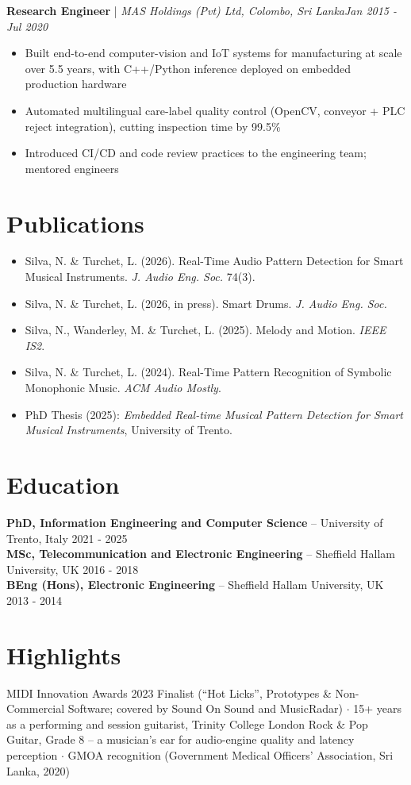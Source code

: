 \documentclass[11pt]{article}
\newenvironment{cvrole}[5]{%
  \par\noindent\textbf{\large #1} | \textit{\small #2, #3}\hfill \textit{\small #4 - #5}\par
  \begin{itemize}[leftmargin=2em, itemsep=-0.3em, topsep=-0.5em]%
}{%
  \end{itemize}\par\noindent\mbox{}\par\vspace{0.1em}%
}
\begin{document}
\begin{cvrole}{Research Engineer}{MAS Holdings (Pvt) Ltd}{Colombo, Sri Lanka}{Jan 2015}{Jul 2020}
    \item Built end-to-end computer-vision and IoT systems for manufacturing at scale over 5.5 years, with C++/Python inference deployed on embedded production hardware
    \item Automated multilingual care-label quality control (OpenCV, conveyor + PLC reject integration), cutting inspection time by 99.5\%
    \item Introduced CI/CD and code review practices to the engineering team; mentored engineers
\end{cvrole}

\enlargethispage{9\baselineskip}
\section*{Publications}
\begin{itemize}[leftmargin=2em, itemsep=-0.2em, topsep=0.2em]
    \item Silva, N. \& Turchet, L. (2026). Real-Time Audio Pattern Detection for Smart Musical Instruments. \textit{J. Audio Eng. Soc.} 74(3).
    \item Silva, N. \& Turchet, L. (2026, in press). Smart Drums. \textit{J. Audio Eng. Soc.}
    \item Silva, N., Wanderley, M. \& Turchet, L. (2025). Melody and Motion. \textit{IEEE IS2}.
    \item Silva, N. \& Turchet, L. (2024). Real-Time Pattern Recognition of Symbolic Monophonic Music. \textit{ACM Audio Mostly}.
    \item PhD Thesis (2025): \textit{Embedded Real-time Musical Pattern Detection for Smart Musical Instruments}, University of Trento.
\end{itemize}

\section*{Education}
\textbf{PhD, Information Engineering and Computer Science} -- University of Trento, Italy \hfill 2021 - 2025 \\
\textbf{MSc, Telecommunication and Electronic Engineering} -- Sheffield Hallam University, UK \hfill 2016 - 2018 \\
\textbf{BEng (Hons), Electronic Engineering} -- Sheffield Hallam University, UK \hfill 2013 - 2014

\enlargethispage{4\baselineskip}
\section*{Highlights}
MIDI Innovation Awards 2023 Finalist (``Hot Licks'', Prototypes \& Non-Commercial Software; covered by Sound On Sound and MusicRadar) $\cdot$ 15+ years as a performing and session guitarist, Trinity College London Rock \& Pop Guitar, Grade 8 -- a musician's ear for audio-engine quality and latency perception $\cdot$ GMOA recognition (Government Medical Officers' Association, Sri Lanka, 2020)
\end{document}
